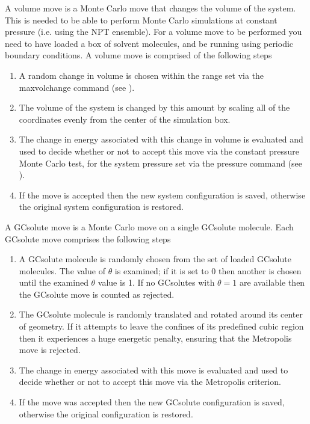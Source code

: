 \documentclass[letterpaper,10pt,english]{sphinxmanual}
\begin{document}
A volume move is a Monte Carlo move that changes the volume of the system. This is needed to be able to perform Monte Carlo simulations at constant pressure (i.e. using the NPT ensemble). For a volume move to be performed you need to have loaded a box of solvent molecules, and be running using periodic boundary conditions. A volume move is comprised of the following steps
\begin{enumerate}
\item {} 
A random change in volume is chosen within the range set via the maxvolchange command (see {\hyperref[\detokenize{protoms:parameters}]{}}).

\item {} 
The volume of the system is changed by this amount by scaling all of the coordinates evenly from the center of the simulation box.

\item {} 
The change in energy associated with this change in volume is evaluated and used to decide whether or not to accept this move via the constant pressure Monte Carlo test, for the system pressure set via the pressure command (see {\hyperref[\detokenize{protoms:parameters}]{}}).

\item {} 
If the move is accepted then the new system configuration is saved, otherwise the original system configuration is restored.

\end{enumerate}

\ignorespaces 
{}

A GCsolute move is a Monte Carlo move on a single GCsolute molecule. Each GCsolute move comprises the following steps
\begin{enumerate}
\item {} 
A GCsolute molecule is randomly chosen from the set of loaded GCsolute molecules.  The value of \(\theta\) is examined; if it is set to 0 then another is chosen until the examined \(\theta\) value is 1.  If no GCsolutes with \(\theta=1\) are available then the GCsolute move is counted as rejected.

\item {} 
The GCsolute molecule is randomly translated and rotated around its center of geometry. If it attempts to leave the confines of its predefined cubic region then it experiences a huge energetic penalty, ensuring that the Metropolis move is rejected.

\item {} 
The change in energy associated with this move is evaluated and used to decide whether or not to accept this move via the Metropolis criterion.

\item {} 
If the move was accepted then the new GCsolute configuration is saved, otherwise the original configuration is restored.

\end{enumerate}
\end{document}
